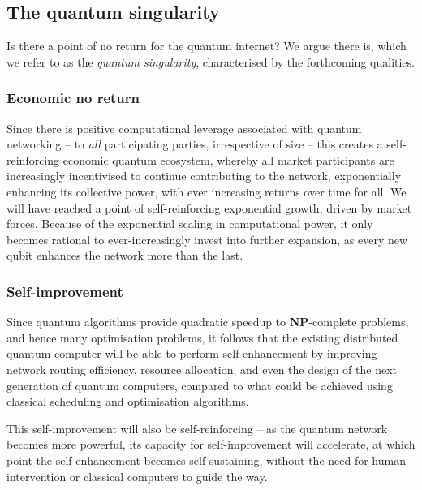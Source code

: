 %
%

\subsection{The quantum singularity} \label{sec:singularity} 

Is there a point of no return for the quantum internet? We argue there is, which we refer to as the \textit{quantum singularity}, characterised by the forthcoming qualities.


%
%

\subsubsection{Economic no return}

Since there is positive computational leverage associated with quantum networking -- to \textit{all} participating parties, irrespective of size -- this creates a self-reinforcing economic quantum ecosystem, whereby all market participants are  increasingly incentivised to continue contributing to the network, exponentially enhancing its collective power, with ever increasing returns over time for all. We will have reached a point of self-reinforcing exponential growth, driven by market forces. Because of the exponential scaling in computational power, it only becomes rational to ever-increasingly invest into further expansion, as every new qubit enhances the network more than the last.

%
%

\subsubsection{Self-improvement}

Since quantum algorithms provide quadratic speedup to \textbf{NP}-complete problems, and hence many optimisation problems, it follows that the existing distributed quantum computer will be able to perform self-enhancement by improving network routing efficiency, resource allocation, and even the design of the next generation of quantum computers, compared to what could be achieved using classical scheduling and optimisation algorithms.

This self-improvement will also be self-reinforcing -- as the quantum network becomes more powerful, its capacity for self-improvement will accelerate, at which point the self-enhancement becomes self-sustaining, without the need for human intervention or classical computers to guide the way.

